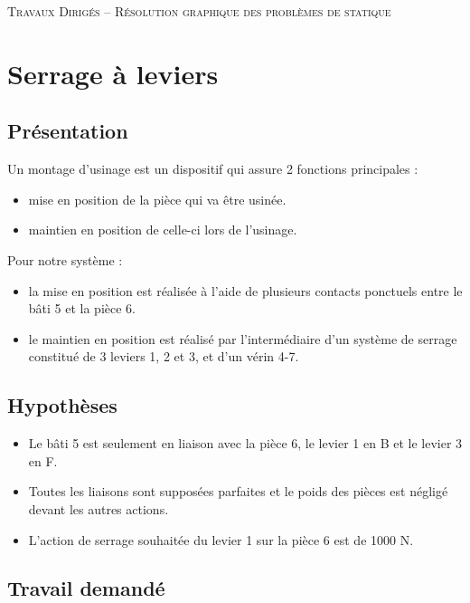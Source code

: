 \documentclass[10pt]{article}
\begin{document}

\begin{center}
\Large{\textsc{Travaux Dirigés -- Résolution graphique des problèmes de statique}}
\end{center}



\section*{Serrage à leviers}
\subsection*{Présentation}

Un montage d’usinage est un dispositif qui assure 2 fonctions principales : 
\begin{itemize}
\item mise en position de la pièce qui va être usinée. 
\item maintien en position de celle-ci lors de l’usinage. 
\end{itemize}
 
Pour notre système : 
\begin{itemize}
\item la mise en position est réalisée à l’aide de plusieurs contacts ponctuels entre le bâti 5 et la pièce 6. 
\item le maintien en position est réalisé par l’intermédiaire d’un système de serrage constitué de 3 leviers 1, 
2 et 3, et d’un vérin 4-7. 
\end{itemize}
 
 
\subsection*{Hypothèses}
\begin{itemize}
\item Le bâti 5 est seulement en liaison avec la pièce 6, le levier 1 en B et le levier 3 en F. 
\item Toutes les liaisons sont supposées parfaites et le poids des pièces est négligé devant les autres 
actions. 
\item L’action de serrage souhaitée du levier 1 sur la pièce 6 est de 1000 N. 
\end{itemize}

\subsection*{Travail demandé}
\end{document}
